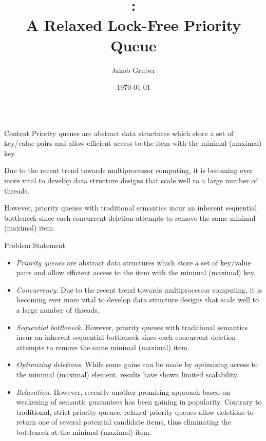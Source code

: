 \documentclass[final,hyperref={pdfpagelabels=true}]{beamer}
\title[Software Engineering \& Internet Computing]{%
  \klsm:\\[0.2\baselineskip]%
  A Relaxed Lock-Free Priority Queue
}
\author[gruber@par.tuwien.ac.at]{Jakob Gruber}
\institute[]{%
  Technische Universit{\"a}t Wien\\[0.25\baselineskip]
  Institut f{\"u}r Informationssysteme\\[0.25\baselineskip]
  Arbeitsbereich: Parallel Computing\\[0.25\baselineskip]
  Betreuer: Prof. Dr. Scient. Jesper Larsson Tr\"aff
}
\date[\today]{\today}
\begin{document}
\begin{frame}
\begin{columns}[t]
\begin{column}{.45\textwidth}
\begin{block}{Context}
\justifying
Priority queues are abstract data structures which store a set of key/value pairs
and allow efficient access to the item with the minimal (maximal) key.

Due to the recent trend towards multiprocessor computing, it is becoming ever
more vital to develop data structure designs that scale well to a large number
of threads.

However, priority queues with traditional semantics incur an inherent sequential
bottleneck since each concurrent deletion attempts to remove the same minimal (maximal)
item.
\end{block}

\begin{block}{Problem Statement}
\begin{itemize}
\justifying
\item \emph{Priority queues} are abstract data structures which store a set of key/value pairs
and allow efficient access to the item with the minimal (maximal) key.

\item \emph{Concurrency}. Due to the recent trend towards multiprocessor computing, it is becoming ever
more vital to develop data structure designs that scale well to a large number
of threads.

\item \emph{Sequential bottleneck}.
However, priority queues with traditional semantics incur an inherent sequential
bottleneck since each concurrent deletion attempts to remove the same minimal (maximal)
item.

\item \emph{Optimizing deletions}. While some gains can be made by optimizing access to the minimal (maximal)
element, results have shown limited scalability.

\item \emph{Relaxation}. However, recently another promising approach based on weakening of
semantic guarantees has been gaining in popularity. Contrary to traditional,
strict priority queues, relaxed priority queues allow deletions to
return one of several potential candidate items, thus eliminating the
bottleneck at the minimal (maximal) item.
\end{itemize}
\end{block}
\end{column}


\end{columns}
\end{frame}
\end{document}
